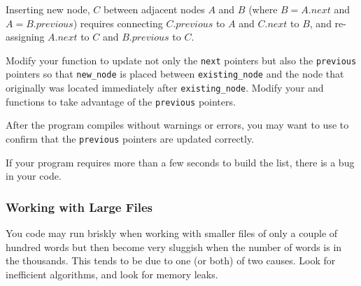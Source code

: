 Inserting new node, $C$ between adjacent nodes $A$ and $B$ (where $B = A.next$ and $A = B.previous$) requires connecting $C.previous$ to $A$ and $C.next$ to $B$, and re-assigning $A.next$ to $C$ and $B.previous$ to $C$.

Modify your  function to update not only the \lstinline{next} pointers but also the \lstinline{previous} pointers so that \lstinline{new_node} is placed between \lstinline{existing_node} and the node that originally was located immediately after \lstinline{existing_node}.
Modify your  and  functions to take advantage of the \lstinline{previous} pointers.

After the program compiles without warnings or errors, you may want to use  to confirm that the \lstinline{previous} pointers are updated correctly.

If your program requires more than a few seconds to build the list, there is a bug in your code.

\subsubsection*{Working with Large Files}

You code may run briskly when working with smaller files of only a couple of hundred words but then become very sluggish when the number of words is in the thousands.
This tends to be due to one (or both) of two causes.
Look for inefficient algorithms, and look for memory leaks.

